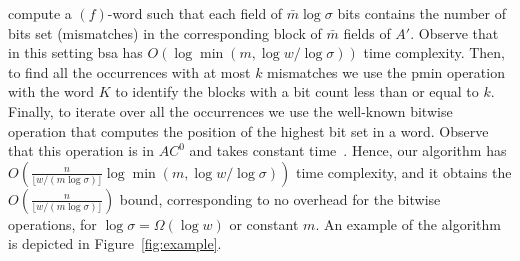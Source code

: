 \documentclass{llncs}
\newcommand{\floor}[1]{\lfloor #1 \rfloor}
\newcommand{\wrbound}{$O(\frac{n}{\floor{w/(m\log\sigma)}}\log \min(m, \log w / \log\sigma))$\xspace}
\newcommand{\fword}[1]{$(#1)$-word}
\begin{document}
compute a \fword{f} such that each field of
$\bar{m}\log\sigma$ bits contains the number of bits set
(mismatches) in the corresponding block of $\bar{m}$ fields of $A'$.
Observe that in this setting \textsf{bsa} has $O(\log\min(m,\log w /
\log\sigma))$ time complexity. Then, to find all the occurrences with
at most $k$ mismatches we use the \textsf{pmin} operation with the
word $K$ to identify the blocks with a bit count less than or equal to
$k$. Finally, to iterate over all the occurrences we use the
well-known bitwise operation that computes the position of the highest
bit set in a word. Observe that this operation is in $AC^0$ and takes
constant time~\cite{DBLP:journals/tcs/AnderssonMT99}. Hence, our
algorithm has \wrbound time complexity, and it obtains the
$O(\frac{n}{\floor{w/(m\log\sigma)}})$ bound, corresponding to no
overhead for the bitwise operations, for $\log\sigma =
\Omega(\log w)$ or constant $m$.
An example of the algorithm is depicted in Figure~\ref{fig:example}.
\end{document}
